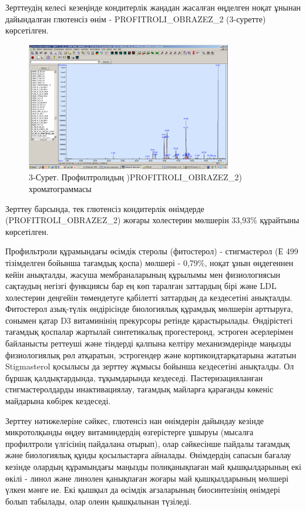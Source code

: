 Зерттеудің келесі кезеңінде кондитерлік жаңадан жасалған өңделген ноқат
ұнынан дайындалған глютенсіз өнім - PROFITROLI\_OBRAZEZ\_2 (3-суретте)
көрсетілген.

\begin{figure}[H]
	\centering
	\includegraphics[width=0.8\textwidth]{media/pish/image15}
	\caption*{3-Сурет. Профилтролидың )PROFITROLI\_OBRAZEZ\_2)
	хроматограммасы}
\end{figure}



Зерттеу барсында, тек глютенсіз кондитерлік өнімдерде
(PROFITROLI\_OBRAZEZ\_2) жоғары холестерин мөлшерін 33,93\% құрайтыны
көрсетілген.

Профильтроли құрамындағы өсімдік стеролы (фитостерол) - стигмастерол (Е
499 тізімделген бойынша тағамдық қоспа) мөлшері - 0,79\%, ноқат ұнын
өңдегеннен кейін анықталды, жасуша мембраналарының құрылымы мен
физиологиясын сақтаудың негізгі функциясы бар ең көп таралған заттардың
бірі және LDL холестерин деңгейін төмендетуге қабілетті заттардың да
кездесетіні анықталды. Фитостерол азық-түлік өндірісінде биологиялық
құрамдық мөлшерін арттыруға, сонымен қатар D3 витаминінің прекурсоры
ретінде қарастырылады. Өндірістегі тағамдық қоспалар жартылай
синтетикалық прогестеронд, эстроген әсерлерімен байланысты реттеуші және
тіндерді қалпына келтіру механизмдерінде маңызды физиологиялық рөл
атқаратын, эстрогендер және кортикоидтарқатарына жататын Stigmasterol
қосылысы да зерттеу жұмысы бойынша кездесетіні анықталды. Ол бұршақ
қалдықтардында, тұқымдарында кездеседі. Пастеризацияланған
стигмастеролдарды инактивациялау, тағамдық майларға қарағанды көкеніс
майдарына көбiрек кездеседі.

Зерттеу нәтижелеріне сәйкес, глютенсіз нан өнімдерін дайындау кезінде
микротолқынды өңдеу витаминдердің өзгерістерге ұшыруы (мысалға
профилтроли үлгісінің пайдалана отырып), олар сәйкесінше пайдалы
тағамдық және биологиялық құнды қосылыстарға айналады. Өнімдердің
сапасын бағалау кезінде олардың құрамындағы маңызды полиқанықпаған май
қышқылдарының екі өкілі - линол және линолен қанықпаған жоғары май
қышқылдарының мөлшері үлкен мәнге ие. Екі қышқыл да өсімдік ағзаларының
биосинтезінің өнімдері болып табылады, олар олеин қышқылынан түзіледі.

